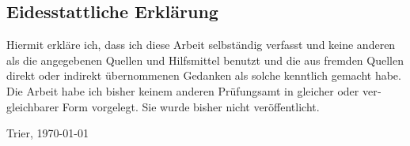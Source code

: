 \begin{otherlanguage}{ngerman}

  \chapter*{Eidesstattliche Erklärung}

  Hiermit erkläre ich, dass ich diese Arbeit selbständig verfasst und
  keine anderen als die angegebenen Quellen und Hilfsmittel benutzt
  und die aus fremden Quellen direkt oder indirekt übernommenen
  Gedanken als solche kenntlich gemacht habe.
  Die Arbeit habe ich bisher keinem anderen Prüfungsamt in gleicher
  oder vergleichbarer Form vorgelegt.
  Sie wurde bisher nicht veröffentlicht.

  \bigskip

  \noindent
  Trier, \today

\end{otherlanguage}
